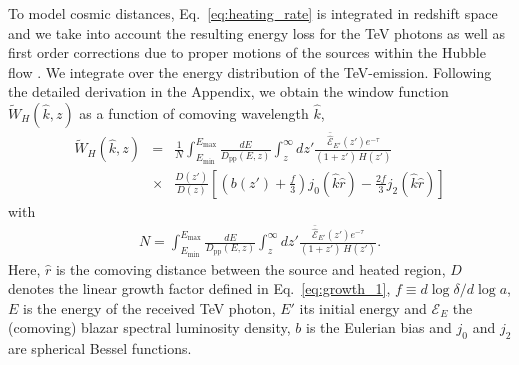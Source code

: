 \documentclass[numberedappendix]{emulateapj}
\begin{document}
To model cosmic distances, Eq.~\eqref{eq:heating_rate} is integrated in redshift space and we take into account the resulting energy loss for the TeV photons as well as first order corrections due to proper motions of the sources within the Hubble flow \citep{1987MNRAS.227....1K}. We integrate over the energy distribution of the TeV-emission. Following the detailed derivation in the Appendix, we obtain the window function $\tilde{W}_H(\hat{k},z)$ as a function of comoving wavelength $\hat{k}$,
\begin{eqnarray}
\label{eq:window}
\tilde{W}_H(\hat{k},z)&=&\frac{1}{N}\int_{E_{\mathrm{min}}}^{E_{\mathrm{max}}}\frac{dE}{D_{\mathrm{pp}}(E,z)}
\int_z^{\infty}dz' \frac{\mathcal{\bar{\hat E}}_{E'}(z')e^{-\tau}}{(1+z')\,H(z')} \nonumber\\
&\times& \frac{D(z')}{D(z)}\left[\left(b(z')+\frac{f}{3}\right)j_0(\hat k \hat r)-\frac{2f}{3}j_2(\hat k \hat r)\right]
\end{eqnarray}
with
\begin{eqnarray}
\label{eq:define_N}
N=\int_{E_{\mathrm{min}}}^{E_{\mathrm{max}}} \frac{dE}{{D_{\mathrm{pp}}}(E,z)}
\int_z^{\infty} dz'   \frac{\mathcal{\bar{\hat E}}_{E'}(z') e^{-\tau}}{(1+z')\,H(z')}.
\end{eqnarray}
Here, $\hat{r}$ is the comoving distance between the source and heated
region, $D$ denotes the linear growth factor defined in
Eq.~\eqref{eq:growth_1}, $f\equiv d\log \delta/d \log a$, $E$ is the
energy of the received TeV photon, $E'$ its initial energy and
$\mathcal{E}_E$ the (comoving) blazar spectral luminosity density, $b$
is the Eulerian bias and $j_0$ and $j_2$ are spherical Bessel
functions.
\end{document}
